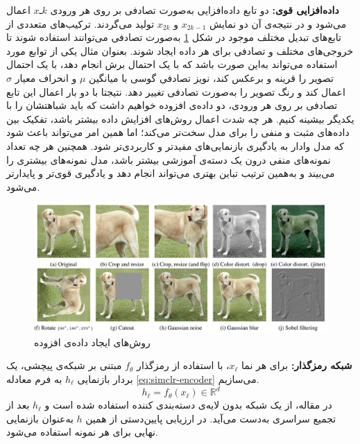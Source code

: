 \noindent\textbf{داده‌افزایی قوی:}
دو تابع داده‌افزایی به‌صورت تصادفی بر روی هر ورودی $xـk$
اعمال می‌شود و در نتیجه‌ی آن دو نمایش
$x_{2k-1}$ و $x_{2k}$ تولید می‌گردند.
ترکیب‌های متعددی از تابع‌های تبدیل مختلف موجود در شکل
\ref{fig:simclr-augmentations}
به‌صورت تصادفی می‌توانند استفاده شوند تا خروجی‌های مختلف و تصادفی برای هر داده ایجاد شوند. بعنوان مثال یکی از توابع مورد استفاده می‌تواند به‌این صورت باشد که با یک احتمال برش انجام دهد، با یک احتمال تصویر را قرینه و برعکس کند، نویز تصادفی گوسی با میانگین
$\mu$ و انحراف معیار $\sigma$
اعمال کند و رنگ تصویر را به‌صورت تصادفی تغییر دهد. نتیجتا با دو بار اعمال این تابع تصادفی بر روی هر ورودی، دو داده‌ی افزوده خواهیم داشت که باید شباهتشان را با یکدیگر بیشینه کنیم. هر چه شدت اعمال روش‌های افزایش داده بیشتر باشد، تفکیک بین داده‌های مثبت و منفی را برای مدل سخت‌تر می‌کند؛ اما همین امر می‌تواند باعث شود که مدل وادار به یادگیری بازنمایی‌های مفیدتر و کاربردی‌تر شود. همچنین هر چه تعداد نمونه‌های منفی درون یک دسته‌ی آموزشی بیشتر باشد، مدل نمونه‌های بیشتری را می‌بیند و به‌همین ترتیب تباین بهتری می‌تواند انجام دهد و یادگیری قوی‌تر و پایدارتر می‌شود.
\begin{figure}[t!]
\centering
\includegraphics[width=1\textwidth]{Images/Chapter2/simclr-augmentations.png}
\caption{روش‌های ایجاد داده‌ی افزوده}
\label{fig:simclr-augmentations}
\end{figure}

\noindent\textbf{شبکه رمزگذار:}
برای هر نما $x_\ell$،
با استفاده از رمزگذار $f_\theta$ مبتنی بر شبکه‌ی پیچشی،
یک بردار بازنمایی $h_\ell$
به فرم معادله \ref{eq:simclr-encoder} می‌سازیم.
\begin{equation}
\label{eq:simclr-encoder}
h_\ell = f_\theta(x_\ell)\in\mathbb{R}^d
\end{equation}
در مقاله، از یک شبکه 
بدون لایه‌ی دسته‌بندی کننده استفاده شده است و
$h_\ell$
بعد از تجمیع سراسری به‌دست می‌آید. در ارزیابی پایین‌دستی از همین $h$
به‌عنوان بازنمایی نهایی برای هر نمونه استفاده می‌شود.

